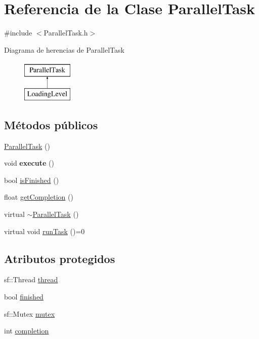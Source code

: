 \hypertarget{classParallelTask}{}\section{Referencia de la Clase Parallel\+Task}
\label{classParallelTask}


{\ttfamily \#include $<$Parallel\+Task.\+h$>$}

Diagrama de herencias de Parallel\+Task\begin{figure}[H]
\begin{center}
\leavevmode
\includegraphics[height=2.000000cm]{classParallelTask}
\end{center}
\end{figure}
\subsection*{Métodos públicos}
\begin{DoxyCompactItemize}
\item 
\hyperlink{classParallelTask_a32cb3c361f7b4373f941f0993940576f}{Parallel\+Task} ()
\item 
\hypertarget{classParallelTask_ad1e7ba9134cc7961ab178a2f47cf54be}{}void {\bfseries execute} ()\label{classParallelTask_ad1e7ba9134cc7961ab178a2f47cf54be}

\item 
bool \hyperlink{classParallelTask_a1a67f547aa382fac2087184b2eb19148}{is\+Finished} ()
\item 
float \hyperlink{classParallelTask_ada45e4db1aa8a89f20ab0b8662c6dabc}{get\+Completion} ()
\item 
virtual \hyperlink{classParallelTask_aa0832c15ace4a003c1a9e617e48ccb17}{$\sim$\+Parallel\+Task} ()
\item 
virtual void \hyperlink{classParallelTask_a494412a04608d42f3ba91b1b242fd149}{run\+Task} ()=0
\end{DoxyCompactItemize}
\subsection*{Atributos protegidos}
\begin{DoxyCompactItemize}
\item 
sf\+::\+Thread \hyperlink{classParallelTask_a8ad7af10ec7f3e7fa84998111d280e97}{thread}
\item 
bool \hyperlink{classParallelTask_a924792685ebc2bd3bf8ec80e0dabe99f}{finished}
\item 
sf\+::\+Mutex \hyperlink{classParallelTask_a39d71d5f6fd7fe3de25452c147028c91}{mutex}
\item 
int \hyperlink{classParallelTask_a415d5be8b846af856f0a5b651711a4ad}{completion}
\end{DoxyCompactItemize}


